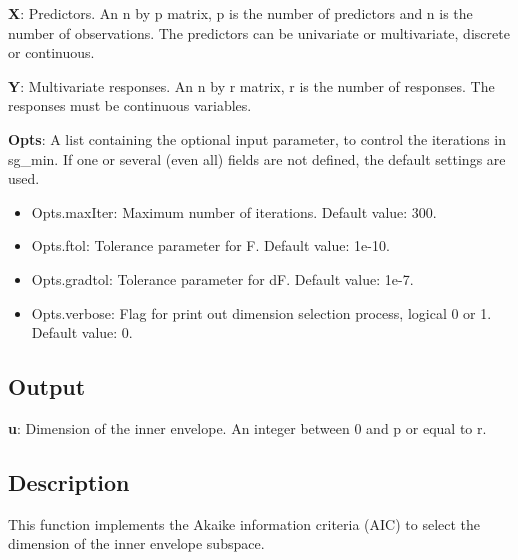 \documentclass[a4paper,11pt,openany]{memoir}
\begin{document}
\begin{par}
\textbf{X}: Predictors. An n by p matrix, p is the number of predictors and n is the number of observations. The predictors can be univariate or multivariate, discrete or continuous.
\end{par} \vspace{1em}
\begin{par}
\textbf{Y}: Multivariate responses. An n by r matrix, r is the number of responses. The responses must be continuous variables.
\end{par} \vspace{1em}
\begin{par}
\textbf{Opts}: A list containing the optional input parameter, to control the iterations in sg\_min. If one or several (even all) fields are not defined, the default settings are used.
\end{par} \vspace{1em}
\begin{itemize}
\setlength{\itemsep}{-1ex}
   \item Opts.maxIter: Maximum number of iterations.  Default value: 300.
   \item Opts.ftol: Tolerance parameter for F.  Default value: 1e-10.
   \item Opts.gradtol: Tolerance parameter for dF.  Default value: 1e-7.
   \item Opts.verbose: Flag for print out dimension selection process, logical 0 or 1. Default value: 0.
\end{itemize}


\subsection*{Output}

\begin{par}
\textbf{u}: Dimension of the inner envelope. An integer between 0 and p or equal to r.
\end{par} \vspace{1em}


\subsection*{Description}

\begin{par}
This function implements the Akaike information criteria (AIC) to select the dimension of the inner envelope subspace.
\end{par} \vspace{1em}
\end{document}
